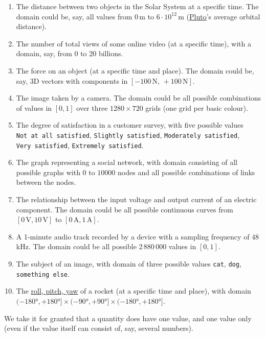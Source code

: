 \documentclass[
  a4paper,
  DIV=11,
  numbers=noendperiod,
  oneside]{scrreprt}
\begin{document}
\begin{enumerate}
\def\labelenumi{\arabic{enumi}.}
\item
  The distance between two objects in the Solar System at a specific
  time. The domain could be, say, all values from \(0\,\mathrm{m}\) to
  \(6\cdot10^{12}\,\mathrm{m}\)
  (\href{https://solarsystem.nasa.gov/planets/dwarf-planets/pluto}{Pluto}'s
  average orbital distance).
\item
  The number of total views of some online video (at a specific time),
  with a domain, say, from 0 to 20 billions.
\item
  The force on an object (at a specific time and place). The domain
  could be, say, 3D vectors with components in
  \([-100\,\mathrm{N},\,+100\,\mathrm{N}]\).
\item
  The image taken by a camera. The domain could be all possible
  combinations of values in \([0,1]\) over three \(1280\times 720\)
  grids (one grid per basic colour).
\item
  The degree of satisfaction in a customer survey, with five possible
  values \texttt{Not\ at\ all\ satisfied}, \texttt{Slightly\ satisfied},
  \texttt{Moderately\ satisfied}, \texttt{Very\ satisfied},
  \texttt{Extremely\ satisfied}.
\item
  The graph representing a social network, with domain consisting of all
  possible graphs with \(0\) to \(10000\) nodes and all possible
  combinations of links between the nodes.
\item
  The relationship between the input voltage and output current of an
  electric component. The domain could be all possible continuous curves
  from \([0\,\mathrm{V}, 10\,\mathrm{V}]\) to
  \([0\,\mathrm{A}, 1\,\mathrm{A}]\).
\item
  A 1-minute audio track recorded by a device with a sampling frequency
  of 48\,kHz. The domain could be all possible 2\,880\,000 values in
  \([0,1]\).
\item
  The subject of an image, with domain of three possible values
  \texttt{cat}, \texttt{dog}, \texttt{something\ else}.
\item
  The
  \href{https://www.grc.nasa.gov/www/k-12/rocket/rotations.html}{roll,
  pitch, yaw} of a rocket (at a specific time and place), with domain
  \((-180°,+180°]\times(-90°,+90°]\times(-180°,+180°]\).
\end{enumerate}

We take it for granted that a quantity does have one value, and one
value only (even if the value itself can consist of, say, several
numbers).
\end{document}
